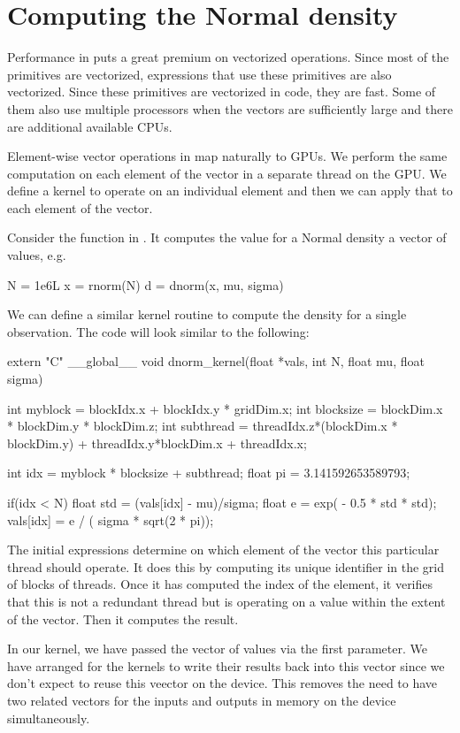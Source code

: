 \section{Computing the Normal density}
Performance in \R{} puts a great premium on vectorized
operations.  Since most of the primitives are vectorized,
expressions that use these primitives are also vectorized. 
Since these primitives are vectorized in \C{} code,
they are fast.  Some of them also use multiple
processors when the vectors are sufficiently large
and there are additional available CPUs.

Element-wise vector operations in \R{} map naturally to GPUs.  We
perform the same computation on each element of the vector in a
separate thread on the GPU.  We define a kernel to operate on an
individual element and then we can apply that to each element of the
vector.

Consider the function  in \R.
It computes the value for a Normal density
a vector of values, e.g.
\begin{RCode}
N = 1e6L
x = rnorm(N)
d = dnorm(x, mu, sigma)
\end{RCode}

We can define a similar kernel routine to compute
the density for a single observation.
The code will look similar to the following:
\begin{CCode}
extern "C"
__global__ void 
dnorm_kernel(float *vals, int N, float mu, float sigma)
{
    int myblock = blockIdx.x + blockIdx.y * gridDim.x;
    int blocksize = blockDim.x * blockDim.y * blockDim.z;
    int subthread = threadIdx.z*(blockDim.x * blockDim.y) +
                      threadIdx.y*blockDim.x + threadIdx.x;

    int idx = myblock * blocksize + subthread;
    float pi = 3.141592653589793;

    if(idx < N) {
       float std = (vals[idx] - mu)/sigma;
       float e = exp( - 0.5 * std * std);
       vals[idx] = e / ( sigma * sqrt(2 * pi));
    }
}
\end{CCode}
The initial expressions determine on which element of the vector this
particular thread should operate.  It does this by computing its
unique identifier in the grid of blocks of threads.  Once it has
computed the index of the element, it verifies that this is not a
redundant thread but is operating on a value within the extent of the
vector.  Then it computes the result.

In our kernel, we have passed the vector of values via the first
parameter.  We have arranged for the kernels to write their results
back into this vector since we don't expect to reuse this veector on
the device. This removes the need to have two related vectors for the
inputs and outputs in memory on the device simultaneously.

